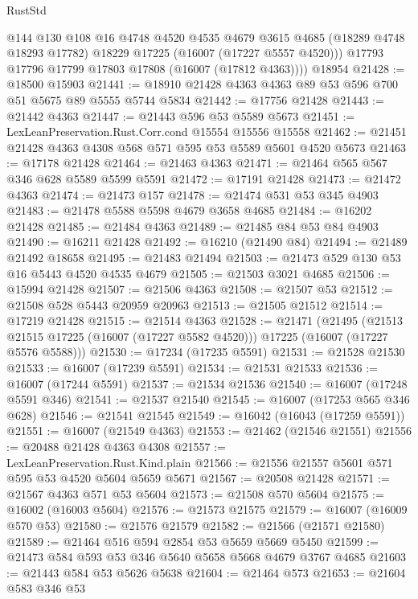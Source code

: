 \begin{lexlean}{RustStd}
\begin{coremodule}
          @144
          @130
          @108
          @16
          @4748
          @4520
          @4535
          @4679
          @3615
          @4685
          (@18289 @4748 @18293 @17782)
          @18229
          @17225
          (@16007 (@17227 @5557 @4520)))
        @17793
        @17796
        @17799
        @17803
        @17808
        (@16007 (@17812 @4363))))
    @18954
@21428 := @18500 @15903
@21441 := @18910 @21428 @4363 @4363 @89 @53 @596 @700 @51 @5675 @89 @5555 @5744 @5834
@21442 := @17756 @21428
@21443 := @21442 @4363
@21447 := @21443 @596 @53 @5589 @5673
@21451 := LexLeanPreservation.Rust.Corr.cond @15554 @15556 @15558
@21462 := @21451 @21428 @4363 @4308 @568 @571 @595 @53 @5589 @5601 @4520 @5673
@21463 := @17178 @21428
@21464 := @21463 @4363
@21471 := @21464 @565 @567 @346 @628 @5589 @5599 @5591
@21472 := @17191 @21428
@21473 := @21472 @4363
@21474 := @21473 @157
@21478 := @21474 @531 @53 @345 @4903
@21483 := @21478 @5588 @5598 @4679 @3658 @4685
@21484 := @16202 @21428
@21485 := @21484 @4363
@21489 := @21485 @84 @53 @84 @4903
@21490 := @16211 @21428
@21492 := @16210 (@21490 @84)
@21494 := @21489 @21492 @18658
@21495 := @21483 @21494
@21503 := @21473 @529 @130 @53 @16 @5443 @4520 @4535 @4679
@21505 := @21503 @3021 @4685
@21506 := @15994 @21428
@21507 := @21506 @4363
@21508 := @21507 @53
@21512 := @21508 @528 @5443 @20959 @20963
@21513 := @21505 @21512
@21514 := @17219 @21428
@21515 := @21514 @4363
@21528 := @21471
    (@21495
      (@21513 @21515 @17225 (@16007 (@17227 @5582 @4520)))
      @17225
      (@16007 (@17227 @5576 @5588)))
@21530 := @17234 (@17235 @5591)
@21531 := @21528 @21530
@21533 := @16007 (@17239 @5591)
@21534 := @21531 @21533
@21536 := @16007 (@17244 @5591)
@21537 := @21534 @21536
@21540 := @16007 (@17248 @5591 @346)
@21541 := @21537 @21540
@21545 := @16007 (@17253 @565 @346 @628)
@21546 := @21541 @21545
@21549 := @16042 (@16043 (@17259 @5591))
@21551 := @16007 (@21549 @4363)
@21553 := @21462 (@21546 @21551)
@21556 := @20488 @21428 @4363 @4308
@21557 := LexLeanPreservation.Rust.Kind.plain
@21566 := @21556 @21557 @5601 @571 @595 @53 @4520 @5604 @5659 @5671
@21567 := @20508 @21428
@21571 := @21567 @4363 @571 @53 @5604
@21573 := @21508 @570 @5604
@21575 := @16002 (@16003 @5604)
@21576 := @21573 @21575
@21579 := @16007 (@16009 @570 @53)
@21580 := @21576 @21579
@21582 := @21566 (@21571 @21580)
@21589 := @21464 @516 @594 @2854 @53 @5659 @5669 @5450
@21599 := @21473 @584 @593 @53 @346 @5640 @5658 @5668 @4679 @3767 @4685
@21603 := @21443 @584 @53 @5626 @5638
@21604 := @21464 @573
@21653 := @21604
    @583
    @346
    @53

\end{coremodule}
\end{lexlean}
